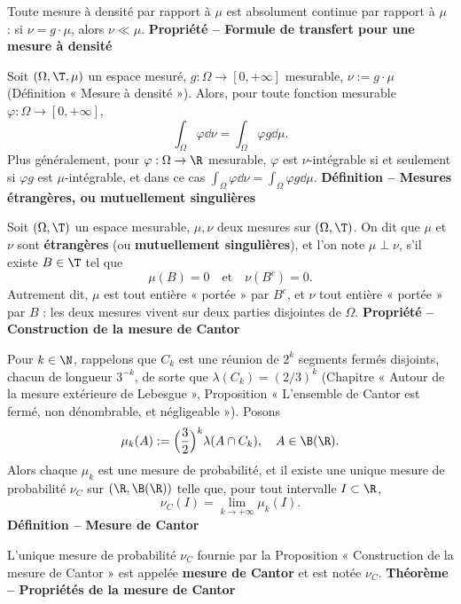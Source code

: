 Toute mesure à densité par rapport à $\mu$ est absolument continue par rapport à $\mu$ : si $\nu=g\cdot\mu$, alors $\nu\ll\mu$.
\textbf{Propriété – Formule de transfert pour une mesure à densité}

Soit $(\Omega,\T,\mu)$ un espace mesuré, $g:\Omega\to[0,+\infty]$ mesurable, $\nu:=g\cdot\mu$ (Définition « Mesure à densité »). Alors, pour toute fonction mesurable $\varphi:\Omega\to[0,+\infty]$,
\[\int_\Omega\varphi\dd\nu=\int_\Omega\varphi g\dd\mu.\]
Plus généralement, pour $\varphi:\Omega\to\R$ mesurable, $\varphi$ est $\nu$-intégrable si et seulement si $\varphi g$ est $\mu$-intégrable, et dans ce cas $\int_\Omega\varphi\dd\nu=\int_\Omega\varphi g\dd\mu$.
\textbf{Définition – Mesures étrangères, ou mutuellement singulières}

Soit $(\Omega,\T)$ un espace mesurable, $\mu,\nu$ deux mesures sur $(\Omega,\T)$. On dit que $\mu$ et $\nu$ sont \textbf{étrangères} (ou \textbf{mutuellement singulières}), et l’on note $\mu\perp\nu$, s’il existe $B\in\T$ tel que
\[\mu(B)=0\quad\text{et}\quad\nu(B^c)=0.\]
Autrement dit, $\mu$ est tout entière « portée » par $B^c$, et $\nu$ tout entière « portée » par $B$ : les deux mesures vivent sur deux parties disjointes de $\Omega$.
\textbf{Propriété – Construction de la mesure de Cantor}

Pour $k\in\N$, rappelons que $C_k$ est une réunion de $2^k$ segments fermés disjoints, chacun de longueur $3^{-k}$, de sorte que $\lambda(C_k)=(2/3)^k$ (Chapitre « Autour de la mesure extérieure de Lebesgue », Proposition « L’ensemble de Cantor est fermé, non dénombrable, et négligeable »). Posons
\[\mu_k(A):=\Bigl(\frac32\Bigr)^k\lambda(A\cap C_k),\quad A\in\B(\R).\]
Alors chaque $\mu_k$ est une mesure de probabilité, et il existe une unique mesure de probabilité $\nu_C$ sur $(\R,\B(\R))$ telle que, pour tout intervalle $I\subset\R$,
\[\nu_C(I)=\lim_{k\to+\infty}\mu_k(I).\]
\textbf{Définition – Mesure de Cantor}

L’unique mesure de probabilité $\nu_C$ fournie par la Proposition « Construction de la mesure de Cantor » est appelée \textbf{mesure de Cantor} et est notée $\nu_C$.
\textbf{Théorème – Propriétés de la mesure de Cantor}

